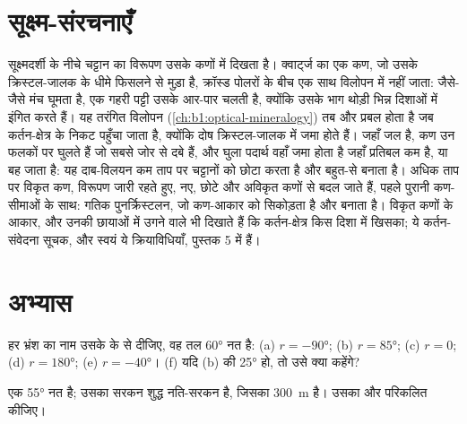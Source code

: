\begin{omfigure}
\label{fig:b1:faults-folds-fabrics:vergence}
\end{omfigure}

\section{सूक्ष्म-संरचनाएँ}\label{sec:b1:faults-folds-fabrics:micro}

सूक्ष्मदर्शी के नीचे चट्टान का विरूपण उसके कणों में दिखता है। क्वार्ट्ज का एक कण, जो उसके क्रिस्टल-जालक के धीमे फिसलने से मुड़ा है, क्रॉस्ड पोलरों के बीच एक साथ विलोपन में नहीं जाता: जैसे-जैसे मंच घूमता है, एक गहरी पट्टी उसके आर-पार चलती है, क्योंकि उसके भाग थोड़ी भिन्न दिशाओं में इंगित करते हैं। यह तरंगित विलोपन (\cref{ch:b1:optical-mineralogy}) तब और प्रबल होता है जब कर्तन-क्षेत्र के निकट पहुँचा जाता है, क्योंकि दोष क्रिस्टल-जालक में जमा होते हैं। जहाँ जल है, कण उन फलकों पर घुलते हैं जो सबसे जोर से दबे हैं, और घुला पदार्थ वहाँ जमा होता है जहाँ प्रतिबल कम है, या बह जाता है: यह दाब-विलयन कम ताप पर चट्टानों को छोटा करता है और बहुत-से  बनाता है। अधिक ताप पर विकृत कण, विरूपण जारी रहते हुए, नए, छोटे और अविकृत कणों से बदल जाते हैं, पहले पुरानी कण-सीमाओं के साथ: गतिक पुनर्क्रिस्टलन, जो कण-आकार को सिकोड़ता है और  बनाता है। विकृत कणों के आकार, और उनकी छायाओं में उगने वाले  भी दिखाते हैं कि कर्तन-क्षेत्र किस दिशा में खिसका; ये कर्तन-संवेदना सूचक, और स्वयं ये क्रियाविधियाँ, पुस्तक 5 में हैं।

\section{अभ्यास}

\begin{exercise}[$\star$]
\label{exo:b1:faults-folds-fabrics:1}
हर भ्रंश का नाम उसके  के  से दीजिए, वह तल \ang{60} नत है: (a) $r = \ang{-90}$; (b) $r = \ang{85}$; (c) $r = 0$; (d) $r = \ang{180}$; (e) $r = \ang{-40}$। (f) यदि (b) की  \ang{25} हो, तो उसे क्या कहेंगे?
\end{exercise}

\begin{exercise}[$\star$]
\label{exo:b1:faults-folds-fabrics:2}
एक  \ang{55} नत है; उसका सरकन शुद्ध नति-सरकन है, जिसका  \qty{300}{m} है। उसका  और  परिकलित कीजिए।
\end{exercise}

